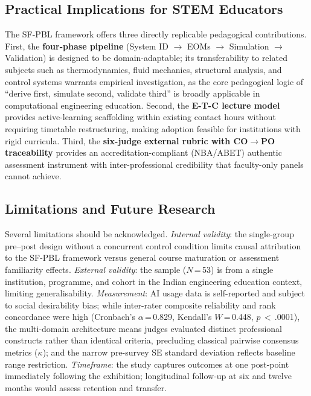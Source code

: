 \documentclass[utf8]{FrontiersinHarvard}
\begin{document}
\subsection{Practical Implications for STEM Educators}

The SF-PBL framework offers three directly replicable pedagogical
contributions. First, the \textbf{four-phase pipeline} (System ID
$\rightarrow$ EOMs $\rightarrow$ Simulation $\rightarrow$ Validation) is
designed to be domain-adaptable; its transferability to related subjects such
as thermodynamics, fluid mechanics, structural analysis, and control systems
warrants empirical investigation, as the core pedagogical logic of ``derive
first, simulate second, validate third'' is broadly applicable in computational
engineering education. Second, the \textbf{E-T-C lecture model} provides
active-learning scaffolding within existing contact hours without requiring
timetable restructuring, making adoption feasible for institutions with rigid
curricula. Third, the \textbf{six-judge external rubric with CO$\rightarrow$PO
traceability} provides an accreditation-compliant (NBA/ABET) authentic
assessment instrument with inter-professional credibility that faculty-only
panels cannot achieve.

\subsection{Limitations and Future Research}
\label{sec:limitations}

Several limitations should be acknowledged. \textit{Internal validity}: the
single-group pre--post design without a concurrent control condition limits
causal attribution to the SF-PBL framework versus general course maturation
or assessment familiarity effects. \textit{External validity}: the sample
($N$\,=\,53) is from a single institution, programme, and cohort in the
Indian engineering education context, limiting generalisability. 
\textit{Measurement}: AI usage data is self-reported and subject to social
desirability bias; while inter-rater composite reliability and rank
concordance were high (Cronbach's $\alpha$\,=\,0.829, Kendall's $W$\,=\,0.448,
$p$\,$<$\,.0001), the multi-domain architecture means judges evaluated distinct
professional constructs rather than identical criteria, precluding classical
pairwise consensus metrics ($\kappa$); and the narrow pre-survey SE standard
deviation reflects baseline range restriction. \textit{Timeframe}: the study
captures outcomes at one post-point immediately following the exhibition;
longitudinal follow-up at six and twelve months would assess retention
and transfer.
\end{document}
